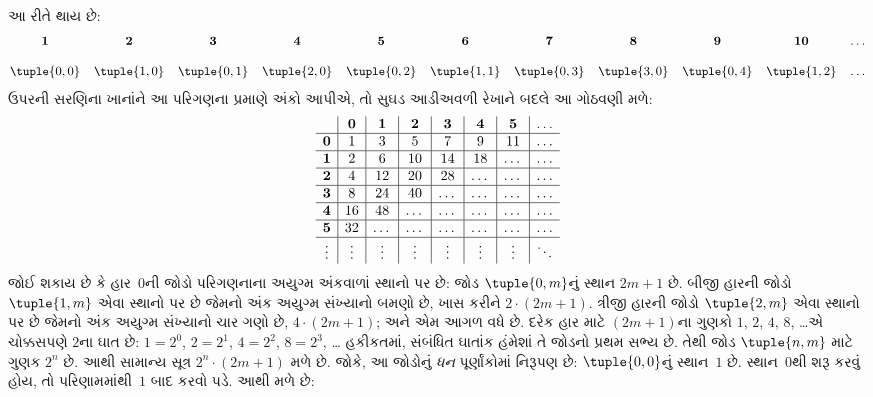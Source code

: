 \begin{explain}
આ રીતે થાય છે:
\[\small
\begin{array}{@{}cc c c c c c c c c c@{}}
\mathbf 1 & \mathbf 2 & \mathbf 3 & \mathbf 4 & \mathbf 5 & \mathbf 6 & \mathbf 7 & \mathbf 8 & \mathbf 9 & \mathbf{10} & \dots \\ \\
\tuple{0,0} & \tuple{1,0} & \tuple{0,1} & \tuple{2,0}  & \tuple{0,2} &
\tuple{1,1} & \tuple{0,3} & \tuple{3,0}  & \tuple{0,4} &  \tuple{1,2} & \dots \\
\end{array}
\]
ઉપરની સરણિના ખાનાંને આ પરિગણના પ્રમાણે અંકો
આપીએ, તો સુઘડ આડીઅવળી રેખાને બદલે આ ગોઠવણી મળે:
\[
\begin{array}{ c | c | c | c | c | c | c | c }
& \mathbf 0 & \mathbf 1 & \mathbf 2 & \mathbf 3 & \mathbf 4 & \mathbf 5 & \dots \\
\hline
\mathbf 0 & 1 & 3 & 5 & 7 & 9 & 11 & \dots \\
\hline
\mathbf 1 & 2 & 6 & 10 & 14 & 18 & \dots & \dots \\
\hline
\mathbf 2 & 4 & 12 & 20 & 28 & \dots & \dots & \dots \\
\hline
\mathbf 3 & 8 & 24 & 40 & \dots & \dots & \dots & \dots \\
\hline
\mathbf 4 & 16 & 48 & \dots & \dots & \dots & \dots & \dots \\
\hline
\mathbf 5 & 32 & \dots & \dots & \dots & \dots & \dots & \dots \\
\hline
\vdots & \vdots & \vdots & \vdots & \vdots & \vdots & \vdots & \ddots\\
\end{array}
\]
જોઈ શકાય છે કે હાર~$0$ની જોડો પરિગણનાના અયુગ્મ
અંકવાળાં સ્થાનો પર છે: જોડ $\tuple{0,m}$નું સ્થાન
$2m+1$ છે. બીજી હારની જોડો $\tuple{1,m}$ એવા
સ્થાનો પર છે જેમનો અંક અયુગ્મ સંખ્યાનો બમણો છે,
ખાસ કરીને $2 \cdot (2m+1)$.
ત્રીજી હારની જોડો $\tuple{2,m}$ એવા સ્થાનો પર
છે જેમનો અંક અયુગ્મ સંખ્યાનો ચાર ગણો છે,
$4 \cdot (2m+1)$; અને એમ આગળ વધે છે.
દરેક હાર માટે $(2m+1)$ના ગુણકો
$1$, $2$, $4$, $8$, \dots એ ચોક્કસપણે
$2$ના ઘાત છે: $1= 2^0$, $2 = 2^1$,
$4 = 2^2$, $8 = 2^3$, \dots\@
હકીકતમાં, સંબંધિત ઘાતાંક હંમેશાં તે જોડનો પ્રથમ
સભ્ય છે. તેથી જોડ $\tuple{n,m}$ માટે ગુણક
$2^n$ છે. આથી સામાન્ય સૂત્ર $2^n \cdot (2m+1)$
મળે છે. જોકે, આ જોડોનું \emph{ધન} પૂર્ણાંકોમાં
નિરૂપણ છે: $\tuple{0,0}$નું સ્થાન~$1$ છે.
સ્થાન~$0$થી શરૂ કરવું હોય, તો પરિણામમાંથી~$1$
બાદ કરવો પડે. આથી મળે છે:
\end{explain}

